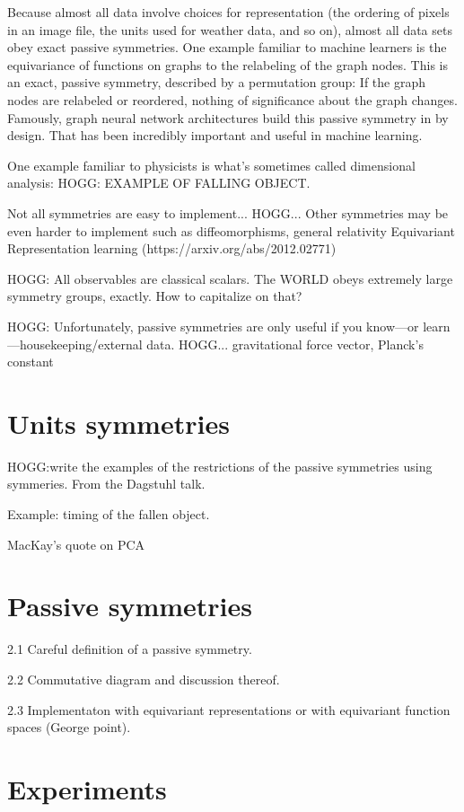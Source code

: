 \documentclass{article}
\theoremstyle{plain}
\theoremstyle{definition}
\theoremstyle{remark}
\begin{document}
Because almost all data involve choices for representation (the ordering of pixels in an image file, the units used for weather data, and so on), almost all data sets obey exact passive symmetries.
One example familiar to machine learners is the equivariance of functions on graphs to the relabeling of the graph nodes.
This is an exact, passive symmetry, described by a permutation group:
If the graph nodes are relabeled or reordered, nothing of significance about the graph changes.
Famously, graph neural network architectures build this passive symmetry in by design.
That has been incredibly important and useful in machine learning.

One example familiar to physicists is what's sometimes called dimensional analysis:
HOGG: EXAMPLE OF FALLING OBJECT.

Not all symmetries are easy to implement... HOGG... Other symmetries may be even harder to implement such as diffeomorphisms, general relativity
Equivariant Representation learning (https://arxiv.org/abs/2012.02771)
   
HOGG: All observables are classical scalars. The WORLD obeys extremely large symmetry groups, exactly. How to capitalize on that?

HOGG: Unfortunately, passive symmetries are only useful if you know---or learn---housekeeping/external data. HOGG... gravitational force vector, Planck's constant

\section{Units symmetries}
HOGG:write the examples of the restrictions of the passive symmetries using symmeries. From the Dagstuhl talk.

Example: timing of the fallen object.

 MacKay's quote on PCA

\section{Passive symmetries}\label{sec:definitions}

   2.1 Careful definition of a passive symmetry.
   
   2.2 Commutative diagram and discussion thereof.
   
   2.3 Implementaton with equivariant representations or with equivariant function spaces (George point).


\section{Experiments}\label{sec:experiments}
\end{document}
